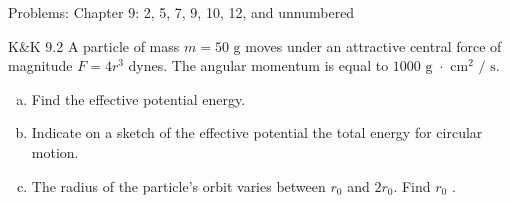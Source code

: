 \documentclass{esg8012pset}
\date{Month Day\csname latex@error\endcsname{Date not yet decided}}
\begin{document}
\noindent Problems: Chapter 9: 2, 5, 7, 9, 10, 12, and unnumbered

\begin{problem}{K\&K 9.2}
  A particle of mass $m = 50\text{ g}$ moves under an attractive central force of magnitude $F = 4r^3$ dynes. The angular momentum is equal to $1000\text{ g $\cdot$ cm$^2$ / s}$.
  \begin{enumerate}[(a)]
    \item Find the effective potential energy.
    \item Indicate on a sketch of the effective potential the total energy for circular motion.
    \item The radius of the particle's orbit varies between $r_0$ and $2r_0$. Find $r_0$ .
  \end{enumerate}
\end{problem}
\end{document}
